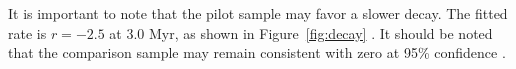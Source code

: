 It is important to note that the pilot sample may favor a slower decay. The fitted rate is $r=-2.5$ at 3.0 Myr, as shown in Figure~\ref{fig:decay} \citep{DemoA}. It should be noted that the comparison sample may remain consistent with zero at 95\% confidence \citep{DemoB}.
